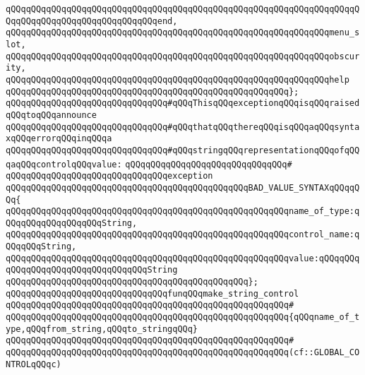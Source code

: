 \verb|qQQqqQQqqQQqqQQqqQQqqQQqqQQqqQQqqQQqqQQqqQQqqQQqqQQqqQQqqQQqqQQqqQQqqQQqqQQqqQQqqQQqqQQqqQQqqQQqqQQqend,|\newline
\verb|qQQqqQQqqQQqqQQqqQQqqQQqqQQqqQQqqQQqqQQqqQQqqQQqqQQqqQQqqQQqqQQqmenu_slot,|\newline
\verb|qQQqqQQqqQQqqQQqqQQqqQQqqQQqqQQqqQQqqQQqqQQqqQQqqQQqqQQqqQQqqQQqobscurity,|\newline
\verb|qQQqqQQqqQQqqQQqqQQqqQQqqQQqqQQqqQQqqQQqqQQqqQQqqQQqqQQqqQQqqQQqhelp|\newline
\verb|qQQqqQQqqQQqqQQqqQQqqQQqqQQqqQQqqQQqqQQqqQQqqQQqqQQqqQQq};|\newline
\newline
\verb|qQQqqQQqqQQqqQQqqQQqqQQqqQQqqQQq#qQQqThisqQQqexceptionqQQqisqQQqraisedqQQqtoqQQqannounce|\newline
\verb|qQQqqQQqqQQqqQQqqQQqqQQqqQQqqQQq#qQQqthatqQQqthereqQQqisqQQqaqQQqsyntaxqQQqerrorqQQqinqQQqa|\newline
\verb|qQQqqQQqqQQqqQQqqQQqqQQqqQQqqQQq#qQQqstringqQQqrepresentationqQQqofqQQqaqQQqcontrolqQQqvalue:|\newline
\verb|qQQqqQQqqQQqqQQqqQQqqQQqqQQqqQQq#|\newline
\verb|qQQqqQQqqQQqqQQqqQQqqQQqqQQqqQQqexception|\newline
\verb|qQQqqQQqqQQqqQQqqQQqqQQqqQQqqQQqqQQqqQQqqQQqqQQqBAD_VALUE_SYNTAXqQQqqQQq{|\newline
\verb|qQQqqQQqqQQqqQQqqQQqqQQqqQQqqQQqqQQqqQQqqQQqqQQqqQQqqQQqname_of_type:qQQqqQQqqQQqqQQqqQQqString,|\newline
\verb|qQQqqQQqqQQqqQQqqQQqqQQqqQQqqQQqqQQqqQQqqQQqqQQqqQQqqQQqcontrol_name:qQQqqQQqString,|\newline
\verb|qQQqqQQqqQQqqQQqqQQqqQQqqQQqqQQqqQQqqQQqqQQqqQQqqQQqqQQqvalue:qQQqqQQqqQQqqQQqqQQqqQQqqQQqqQQqqQQqString|\newline
\verb|qQQqqQQqqQQqqQQqqQQqqQQqqQQqqQQqqQQqqQQqqQQqqQQq};|\newline
\newline
\verb|qQQqqQQqqQQqqQQqqQQqqQQqqQQqqQQqfunqQQqmake_string_control|\newline
\verb|qQQqqQQqqQQqqQQqqQQqqQQqqQQqqQQqqQQqqQQqqQQqqQQqqQQqqQQq#|\newline
\verb|qQQqqQQqqQQqqQQqqQQqqQQqqQQqqQQqqQQqqQQqqQQqqQQqqQQqqQQq{qQQqname_of_type,qQQqfrom_string,qQQqto_stringqQQq}|\newline
\verb|qQQqqQQqqQQqqQQqqQQqqQQqqQQqqQQqqQQqqQQqqQQqqQQqqQQqqQQq#|\newline
\verb|qQQqqQQqqQQqqQQqqQQqqQQqqQQqqQQqqQQqqQQqqQQqqQQqqQQqqQQq(cf::GLOBAL_CONTROLqQQqc)|\newline

